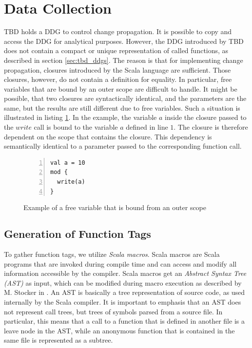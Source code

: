 \section{Data Collection}

TBD holds a DDG to control change propagation. It is possible to copy and access the DDG for analytical purposes. However, the DDG introduced by TBD does not contain a compact or unique representation of called functions, as described in section \ref{sec:tbd_ddgs}. The reason is that for implementing change propagation, closures introduced by the Scala language are sufficient. Those closures, however, do not contain a definition for equality. In particular, free variables that are bound by an outer scope are difficult to handle. It might be possible, that two closures are syntactically identical, and the parameters are the same, but the results are still different due to free variables. Such a situation is illustrated in listing \ref{code:bound_free_var}. In the example, the variable $a$ inside the closure passed to the $write$ call is bound to the variable $a$ defined in line $1$. The closure is therefore dependent on the scope that contains the closure. This dependency is semantically identical to a parameter passed to the corresponding function call. 

\begin{figure}
\begin{lstlisting}[frame=single,basicstyle=\ttfamily,numbers=left,mathescape=true]
val a = 10
mod {
  write(a)
}
\end{lstlisting}
\caption{Example of a free variable that is bound from an outer scope} 
\label{code:bound_free_var}
\end{figure}

\subsection{Generation of Function Tags}

To gather function tags, we utilize \textit{Scala macros}. Scala macros are Scala programs that are invoked during compile time and can access and modify all information accessible by the compiler. Scala macros get an \textit{Abstract Syntax Tree (AST)} as input, which can be modified during macro execution as described by M. Stocker in \cite{stocker2010scala}. An AST is basically a tree representation of source code, as used internally by the Scala compiler. It is important to emphasis that an AST does not represent call trees, but trees of symbols parsed from a source file. In particular, this means that a call to a function that is defined in another file is a leave node in the AST, while an anonymous function that is contained in the same file is represented as a subtree. 

